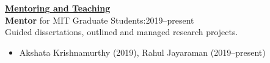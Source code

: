 \documentclass[letterpaper,11pt]{article}
\newcounter{confs}
\newcommand{\talk}[2]{ \begin{tabular}{Aab}\stepcounter{confs}\theconfs.&#1&#2\end{tabular}}
\begin{document}
\underline{\textbf{Mentoring and Teaching}}\\
\textbf{Mentor} for MIT Graduate Students:\hfill2019--present\\
\indent Guided dissertations, outlined and managed research projects.
\begin{itemize}[nosep,label=\textbullet]
\item Akshata Krishnamurthy (2019), Rahul Jayaraman (2019--present)
\end{itemize}
\end{document}
